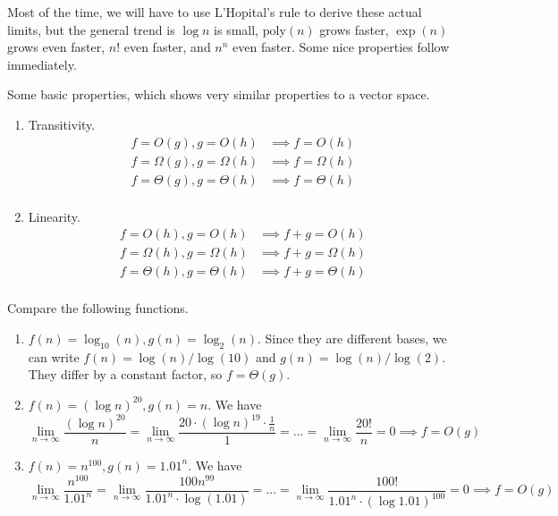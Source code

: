 \documentclass{article}
\begin{document}
  Most of the time, we will have to use L'Hopital's rule to derive these actual limits, but the general trend is $\log n$ is small, $\mathrm{poly}(n)$ grows faster, $\exp(n)$ grows even faster, $n!$ even faster, and $n^n$ even faster. Some nice properties follow immediately. 

  \begin{theorem}[Properties]
    Some basic properties, which shows very similar properties to a vector space. 
    \begin{enumerate}
      \item Transitivity. 
      \begin{align}
        f = O(g), g = O(h) & \implies f = O(h) \\
        f = \Omega(g), g = \Omega(h) & \implies f = \Omega(h) \\
        f = \Theta(g), g = \Theta(h) & \implies f = \Theta(h) \\
      \end{align}

      \item Linearity.  
        \begin{align}
          f = O(h), g = O(h) & \implies f + g = O(h) \\
          f = \Omega(h), g = \Omega(h) & \implies f + g = \Omega(h) \\
          f = \Theta(h), g = \Theta(h) & \implies f + g = \Theta(h) \\
        \end{align}
    \end{enumerate}
  \end{theorem}

  \begin{example}
    Compare the following functions. 
    \begin{enumerate}
      \item $f(n) = \log_{10} (n), g(n) = \log_2 (n)$. Since they are different bases, we can write $f(n) = \log (n) / \log (10)$ and $g(n) = \log(n) / \log(2)$. They differ by a constant factor, so $f = \Theta(g)$. 

      \item $f(n) = (\log n)^{20}, g(n) = n$. We have 
      \begin{equation}
        \lim_{n \rightarrow \infty} \frac{(\log n)^20}{n} = \lim_{n \rightarrow \infty} \frac{20 \cdot (\log n)^{19} \cdot \frac{1}{n}}{1} = \ldots = \lim_{n \rightarrow \infty} \frac{20!}{n} = 0 \implies f = O(g)
      \end{equation}

      \item $f(n) = n^{100}, g(n) = 1.01^n$. We have 
        \begin{equation}
          \lim_{n \rightarrow \infty} \frac{n^{100}}{1.01^n} = \lim_{n \rightarrow \infty} \frac{100 n^{99}}{1.01^n \cdot \log (1.01)} =  \ldots = \lim_{n \rightarrow \infty} \frac{100!}{1.01^n \cdot (\log 1.01)^100} = 0 \implies f = O(g)
        \end{equation}
    \end{enumerate}
  \end{example}
\end{document}
